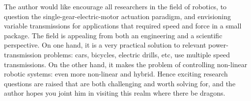 The author would like encourage all researchers in the field of robotics, to question the single-gear-electric-motor actuation paradigm, and envisioning variable transmissions for applications that required speed and force in a small package. The field is appealing from both an engineering and a scientific perspective. On one hand, it is a very practical solution to relevant power-transmission problems: cars, bicycles, electric drills, etc, use multiple speed transmissions. On the other hand, it makes the problem of controlling non-linear robotic systems: even more non-linear and hybrid. Hence exciting research questions are raised that are both challenging and worth solving for, and the author hopes you joint him in visiting this realm where there be dragons.






